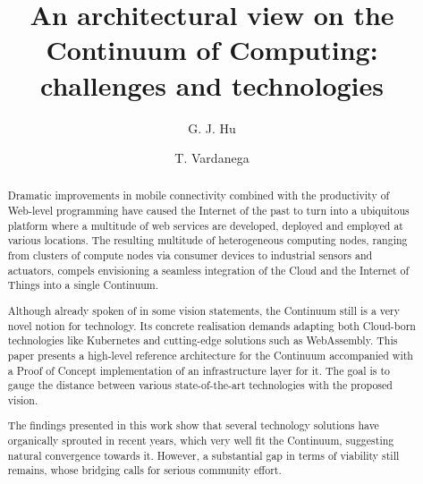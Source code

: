 \documentclass{elsarticle}
\begin{document}
\begin{frontmatter}


\title{An architectural view on the Continuum of Computing: challenges and technologies}

\author[1]{G. J. Hu}
\author[1]{T. Vardanega}
\address[1]{Department of Mathematics, University of Padova, Italy}

\begin{abstract}
Dramatic improvements in mobile connectivity combined with the productivity of Web-level programming have caused the Internet of the past to turn into a ubiquitous platform where a multitude of web services are developed, deployed and employed at various locations. The resulting multitude of heterogeneous computing nodes, ranging from clusters of compute nodes via consumer devices to industrial sensors and actuators, compels envisioning a seamless integration of the Cloud and the Internet of Things into a single Continuum.\par
Although already spoken of in some vision statements, the Continuum still is a very novel notion for technology. Its concrete realisation demands adapting both Cloud-born technologies like Kubernetes and cutting-edge solutions such as WebAssembly. This paper presents a high-level reference architecture for the Continuum accompanied with a Proof of Concept implementation of an infrastructure layer for it. The goal is to gauge the distance between various state-of-the-art technologies with the proposed vision.\par
The findings presented in this work show that several technology solutions have organically sprouted in recent years, which very well fit the Continuum, suggesting natural convergence towards it. However, a substantial gap in terms of viability still remains, whose bridging calls for serious community effort.
\end{abstract}




\end{frontmatter}
\end{document}
